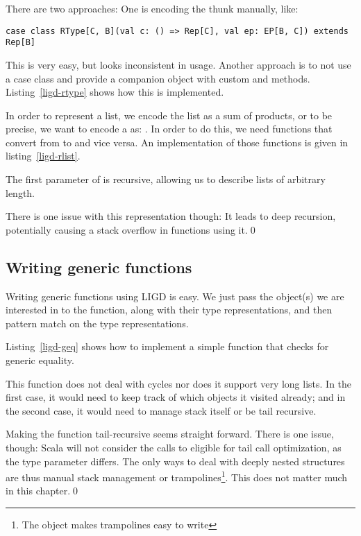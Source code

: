 There are two approaches: One is encoding the thunk manually, like:
\begin{lstlisting}[gobble=2]
  case class RType[C, B](val c: () => Rep[C], val ep: EP[B, C]) extends Rep[B]
\end{lstlisting}
This is very easy, but looks inconsistent in usage. Another approach is to
not use a case class and provide a companion object with custom 
and  methods. Listing~\ref{ligd-rtype} shows how this is
implemented.


\begin{example}[Lists]
In order to represent a list, we encode the
list as a sum of products, or to be precise, we want to encode a 
as: . In order to do this, we need functions
that convert from  to  and
vice versa. An implementation of those functions is given in listing~\ref{ligd-rlist}.


The first parameter of  is recursive, allowing us to describe lists
of arbitrary length.

There is one issue with this representation though: It leads to deep recursion,
potentially causing a stack overflow in functions using it.\qed
\end{example}

\subsection{Writing generic functions}
Writing generic functions using LIGD is easy. We just pass the object(s)
we are interested in to the function, along with their type representations,
and then pattern match on the type representations.

\begin{example}
Listing~\ref{ligd-geq} shows how to implement a simple function that checks for
generic equality.

  

This function does not deal with cycles nor does it support very long lists. In
the first case, it would need to keep track of which objects it visited already;
and in the second case, it would need to manage stack itself or be tail recursive.

Making the function tail-recursive seems straight forward. There is one issue,
though: Scala will not consider the calls to  eligible for tail call
optimization, as the type parameter differs. The only ways to deal with deeply
nested structures are thus manual stack management or trampolines\footnote{The
 object makes trampolines easy to write}. This
does not matter much in this chapter.\qed
\end{example}


